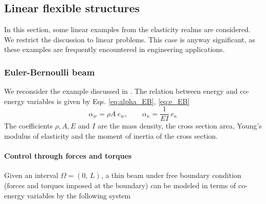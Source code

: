 \subsection{Linear flexible structures}

In this section, some linear examples from the elasticity realms are considered. We restrict the discussion to linear problems. This case is anyway significant, as these examples are frequently encountered in engineering applications. 


\subsubsection{Euler-Bernoulli beam}\label{sec:discr_EB}
We reconsider the example discussed in . The relation between energy and co-energy variables is given by Eqs. \eqref{eq:alpha_EB}, \eqref{eq:e_EB}
\begin{equation}
\alpha_w = \rho A \ e_w, \qquad \alpha_\kappa = \frac{1}{EI}\ e_\kappa
\end{equation}
The coefficients $\rho, A, E$ and $I$  are the mass density, the cross section area, Young's modulus of elasticity and the moment of inertia of the cross section. 

\paragraph{Control through forces and torques} Given an interval $\Omega = (0, \, L)$, a thin beam under free boundary condition (forces and torques imposed at the boundary) can be modeled in terms of co-energy variables by the following system

